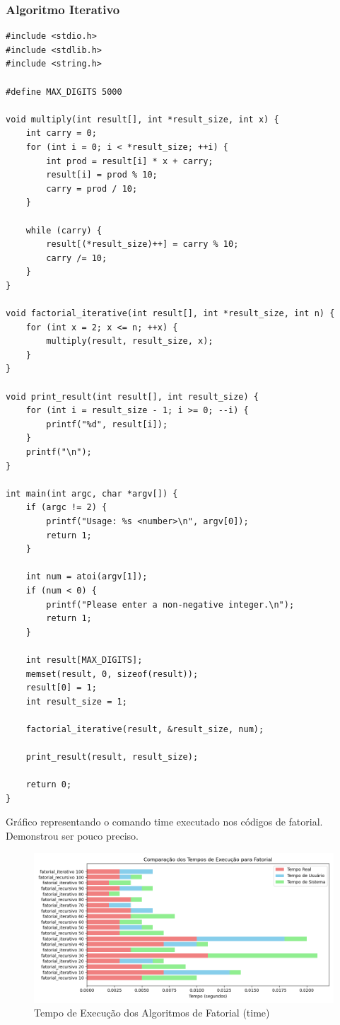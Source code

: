 \documentclass[12pt]{article}
\begin{document}
\subsubsection{Algoritmo Iterativo}
\begin{verbatim}
#include <stdio.h>
#include <stdlib.h>
#include <string.h>

#define MAX_DIGITS 5000

void multiply(int result[], int *result_size, int x) {
    int carry = 0;
    for (int i = 0; i < *result_size; ++i) {
        int prod = result[i] * x + carry;
        result[i] = prod % 10;
        carry = prod / 10;
    }

    while (carry) {
        result[(*result_size)++] = carry % 10;
        carry /= 10;
    }
}

void factorial_iterative(int result[], int *result_size, int n) {
    for (int x = 2; x <= n; ++x) {
        multiply(result, result_size, x);
    }
}

void print_result(int result[], int result_size) {
    for (int i = result_size - 1; i >= 0; --i) {
        printf("%d", result[i]);
    }
    printf("\n");
}

int main(int argc, char *argv[]) {
    if (argc != 2) {
        printf("Usage: %s <number>\n", argv[0]);
        return 1;
    }

    int num = atoi(argv[1]);
    if (num < 0) {
        printf("Please enter a non-negative integer.\n");
        return 1;
    }

    int result[MAX_DIGITS];
    memset(result, 0, sizeof(result));
    result[0] = 1;
    int result_size = 1;

    factorial_iterative(result, &result_size, num);

    print_result(result, result_size);

    return 0;
}
\end{verbatim}

\newpage

Gráfico representando o comando time executado nos códigos de fatorial. Demonstrou ser pouco preciso.

\begin{figure}[H]
    \centering
    \includegraphics[width=\linewidth]{./resultados/time_fatorial.png}
    \caption{Tempo de Execução dos Algoritmos de Fatorial (time)}
    \label{fig:time_fatorial}
\end{figure}
\end{document}
